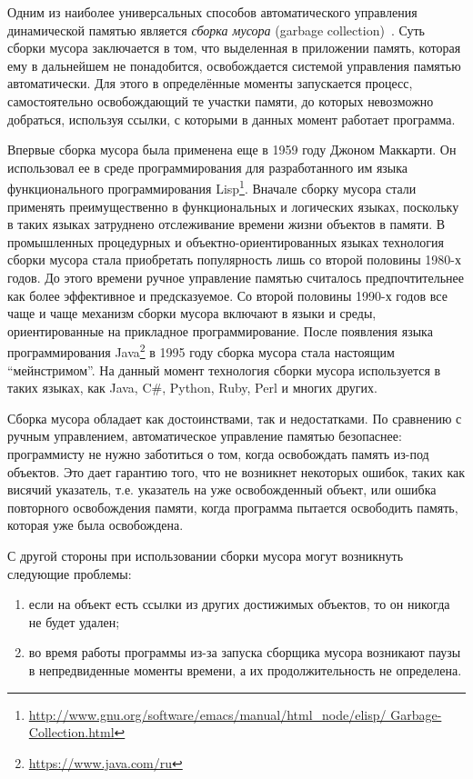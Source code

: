 Одним из наиболее универсальных способов автоматического управления динамической памятью является \emph{сборка мусора} 
(garbage collection)~\cite{GCBook}. Суть сборки мусора заключается в том, что выделенная в приложении память, 
которая ему в дальнейшем не понадобится, освобождается системой управления памятью автоматически. Для этого в 
определённые моменты запускается процесс, самостоятельно освобождающий те участки памяти, до которых невозможно
добраться, используя ссылки, с которыми в данных момент работает программа.
 
Впервые сборка мусора была применена еще  в 1959 году Джоном Маккарти. Он использовал ее в среде программирования для 
разработанного им языка функционального программирования Lisp\footnote{\url{http://www.gnu.org/software/emacs/manual/html\_node/elisp/
Garbage-Collection.html}}.
Вначале сборку мусора стали применять преимущественно в функциональных и логических языках, поскольку в таких языках затруднено
отслеживание времени жизни объектов в памяти. В промышленных процедурных и объектно-ориентированных языках технология сборки мусора стала 
приобретать популярность лишь со второй половины 1980-х годов. До этого времени ручное управление памятью считалось предпочтительнее как более 
эффективное и предсказуемое. Со второй половины 1990-х годов все чаще и чаще механизм сборки мусора включают в языки и среды, ориентированные 
на прикладное программирование. После появления языка программирования Java\footnote{\url{https://www.java.com/ru}} в 1995 году 
сборка мусора стала настоящим ``мейнстримом''.  На данный момент технология сборки мусора используется в таких языках, как Java, C\#, 
Python, Ruby, Perl и многих других. 

Сборка мусора обладает как достоинствами, так и недостатками. По сравнению с ручным управлением, автоматическое 
управление памятью безопаснее: программисту не нужно заботиться о том, когда освобождать память из-под объектов. 
Это дает гарантию того, что не возникнет некоторых ошибок, таких как висячий указатель, т.е. указатель на уже 
освобожденный объект, или ошибка повторного освобождения памяти, когда программа пытается освободить память, 
которая уже была освобождена.

С другой стороны при использовании сборки мусора могут возникнуть следующие проблемы:

\begin{enumerate}
\item если на объект есть ссылки из других достижимых объектов, то он никогда не будет удален;
\item во время работы программы из-за запуска сборщика мусора возникают паузы в непредвиденные моменты времени, а их 
продолжительность не определена.
\end{enumerate}

